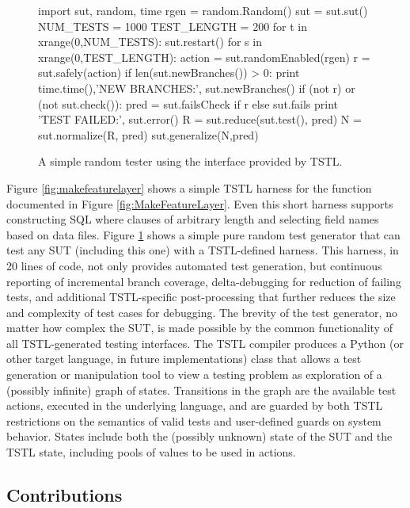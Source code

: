 \begin{figure}
{\scriptsize
\begin{code}
import sut, random, time
rgen = random.Random()
sut = sut.sut()
NUM\_TESTS = 1000
TEST\_LENGTH = 200 
for t in xrange(0,NUM\_TESTS):
   sut.restart()
   for s in xrange(0,TEST\_LENGTH): 
       action = sut.randomEnabled(rgen)
       r = sut.safely(action)
       if len(sut.newBranches()) > 0:
          print time.time(),'NEW BRANCHES:', sut.newBranches()
       if (not r) or (not sut.check()):
          pred = sut.failsCheck if r else sut.fails
          print 'TEST FAILED:', sut.error() 
          R = sut.reduce(sut.test(), pred)
          N = sut.normalize(R, pred) 
          sut.generalize(N,pred)
\end{code}
}
\caption{A simple random tester using the interface provided by TSTL.}
\label{fig:rt}
\end{figure}

Figure \ref{fig:makefeaturelayer} shows a simple TSTL harness for the
function documented in Figure \ref{fig:MakeFeatureLayer}.  Even this
short harness supports constructing SQL where clauses of arbitrary
length and selecting field names based on data files.  Figure
\ref{fig:rt} shows a simple pure random test generator that can test
any SUT (including this one) with a TSTL-defined harness.  This
harness, in 20 lines of code, not only provides automated test
generation, but continuous reporting of incremental branch coverage,
delta-debugging \cite{DD} for reduction of failing tests, and
additional TSTL-specific post-processing that further reduces the size
and complexity of test cases for debugging.  The brevity of the test
generator, no matter how complex the SUT, is made possible by the
common functionality of all TSTL-generated testing interfaces.  The
TSTL compiler produces a Python (or other target language, in future
implementations) class that allows a test generation or manipulation
tool to view a testing problem as exploration of a (possibly infinite)
graph of states.  Transitions in the graph are the available test actions, executed in the underlying language, and are guarded by both TSTL
restrictions on the semantics of valid tests and user-defined guards
on system behavior.  States include both the (possibly unknown) state
of the SUT and the TSTL state, including pools of values to be used in actions.

\subsection{Contributions}

